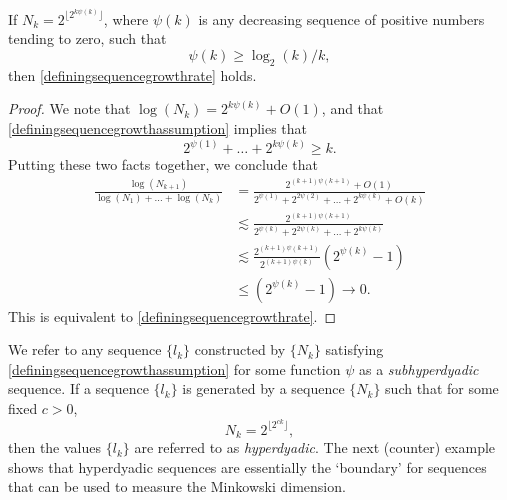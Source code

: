 \begin{theorem} \label{rapidBranching}
	If $N_k = 2^{\lfloor 2^{k \psi(k)} \rfloor}$, where $\psi(k)$ is any decreasing sequence of positive numbers tending to zero, such that
	\begin{equation} \label{definingsequencegrowthassumption} \psi(k) \geq \log_2(k)/k, \end{equation}
	then \eqref{definingsequencegrowthrate} holds.
\end{theorem}
\begin{proof}
	We note that $\log(N_k) = 2^{k \psi(k)} + O(1)$, and that \eqref{definingsequencegrowthassumption} implies that
	\[ 2^{\psi(1)} + \dots + 2^{k \psi(k)} \geq k. \]
	Putting these two facts together, we conclude that
	\begin{align*}
		\frac{\log(N_{k+1})}{\log(N_1) + \dots + \log(N_k)} &= \frac{2^{(k+1) \psi(k+1)} + O(1)}{2^{\psi(1)} + 2^{2 \psi(2)} + \dots + 2^{k \psi(k)} + O(k)}\\
		&\lesssim \frac{2^{(k+1) \psi(k+1)}}{2^{\psi(k)} + 2^{2 \psi(k)} + \dots + 2^{k \psi(k)}}\\
		&\lesssim \frac{2^{(k+1) \psi(k+1)}}{2^{(k+1) \psi(k)}} ( 2^{\psi(k)} - 1 )\\
		&\leq (2^{\psi(k)} - 1) \to 0.
	\end{align*}
	This is equivalent to \eqref{definingsequencegrowthrate}.
\end{proof}
%
We refer to any sequence $\{ l_k \}$ constructed by $\{ N_k \}$ satisfying \eqref{definingsequencegrowthassumption} for some function $\psi$ as a \emph{subhyperdyadic} sequence. If a sequence $\{ l_k \}$ is generated by a sequence $\{ N_k \}$ such that for some fixed $c > 0$,
%
\[ N_k = 2^{\lfloor 2^{ck} \rfloor}, \]
%
then the values $\{ l_k \}$ are referred to as \emph{hyperdyadic}. The next (counter) example shows that hyperdyadic sequences are essentially the `boundary' for sequences that can be used to measure the Minkowski dimension.

